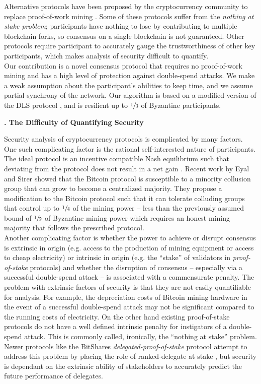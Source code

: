\documentclass[letter,11pt]{article}
\newcounter{myseccnt}     %
\newcounter{mysubseccnt}  %
\newcommand{\mysection}[1]
{\vspace{9mm}\noindent\fontsize{13pt}{15pt}\setcounter{mysubseccnt}{0}
\stepcounter{myseccnt}\textbf{\arabic{myseccnt}. #1}\normalsize\vspace{5mm}}
\begin{document}
Alternative protocols have been proposed by the cryptocurrency community to replace proof-of-work mining \cite{conf:nxt, conf:bitshares}.  Some of these protocols suffer from the \textit{nothing at stake problem};  participants have nothing to lose by contributing to multiple blockchain forks, so consensus on a single blockchain is not guaranteed.  Other protocols require participant to accurately gauge the trustworthiness of other key participants, which makes analysis of security difficult to quantify.\\

Our contribution is a novel consensus protocol that requires no proof-of-work mining and has a high level of protection against double-spend attacks.  We make a weak assumption about the participant’s abilities to keep time, and we assume partial synchrony of the network.  Our algorithm is based on a modified version of the DLS protocol \cite{article:dwork}, and is resilient up to $\sfrac{1}{3}$ of Byzantine participants.



\mysection{The Difficulty of Quantifying Security}

Security analysis of cryptocurrency protocols is complicated by many factors.   One such complicating factor is the rational self-interested nature of participants.  The ideal protocol is an incentive compatible Nash equilibrium such that deviating from the protocol does not result in a net gain \cite{article:kroll}.  Recent work by Eyal and Sirer \cite{article:eyal} showed that the Bitcoin protocol is susceptible to a minority collusion group that can grow to become a centralized majority.  They propose a modification to the Bitcoin protocol such that it can tolerate colluding groups that control up to $\sfrac{1}{4}$ of the mining power – less than the previously assumed bound of $\sfrac{1}{2}$ of Byzantine mining power which requires an honest mining majority that follows the prescribed protocol.\\

Another complicating factor is whether the power to achieve or disrupt consensus is extrinsic in origin (e.g. access to the production of mining equipment or access to cheap electricity) or intrinsic in origin (e.g. the “stake” of validators in \textit{proof-of-stake} protocols) and whether the disruption of consensus – especially via a successful double-spend attack – is associated with a commensurate penalty.  The problem with extrinsic factors of security is that they are not easily quantifiable for analysis.  For example, the depreciation costs of Bitcoin mining hardware in the event of a successful double-spend attack may not be significant compared to the running costs of electricity.  On the other hand existing proof-of-stake protocols do not have a well defined intrinsic penalty for instigators of a double-spend attack.  This is commonly called, ironically, the “nothing at stake” problem.  Newer protocols like the BitShares \textit{delegated-proof-of-stake} protocol attempt to address this problem by placing the role of ranked-delegate at stake \cite{conf:bitshares}, but security is dependant  on the extrinsic ability of stakeholders to accurately predict the future performance of delegates.\\
\end{document}
